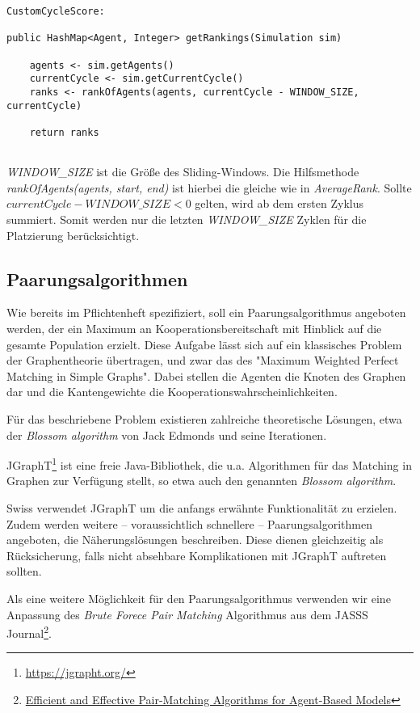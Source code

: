 \begin{lstlisting}
CustomCycleScore:

public HashMap<Agent, Integer> getRankings(Simulation sim) 
	
	agents <- sim.getAgents()
	currentCycle <- sim.getCurrentCycle()
	ranks <- rankOfAgents(agents, currentCycle - WINDOW_SIZE, currentCycle)
	
	return ranks
	
\end{lstlisting}
\emph{WINDOW\_SIZE} ist die Größe des Sliding-Windows. Die Hilfsmethode \emph{rankOfAgents(agents, start, end)} ist hierbei die gleiche wie in \emph{AverageRank}. Sollte $currentCycle - WINDOW\_SIZE < 0$ gelten, wird ab dem ersten Zyklus summiert. Somit werden nur die letzten \emph{WINDOW\_SIZE} Zyklen für die Platzierung berücksichtigt. 


\subsection{Paarungsalgorithmen}

Wie bereits im Pflichtenheft spezifiziert, soll ein Paarungsalgorithmus angeboten werden, der ein Maximum an Kooperationsbereitschaft mit Hinblick auf die gesamte Population erzielt. Diese Aufgabe lässt sich auf ein klassisches Problem der Graphentheorie übertragen, und zwar das des "Maximum Weighted Perfect Matching in Simple Graphs". Dabei stellen die Agenten die Knoten des Graphen dar und die Kantengewichte die Kooperationswahrscheinlichkeiten.

Für das beschriebene Problem existieren zahlreiche theoretische Lösungen, etwa der \emph{Blossom algorithm} von Jack Edmonds und seine Iterationen.

JGraphT\footnote{\href{https://jgrapht.org/}{https://jgrapht.org/}} ist eine freie Java-Bibliothek, die u.a. Algorithmen für das Matching in Graphen zur Verfügung stellt, so etwa auch den genannten \emph{Blossom algorithm}.

Swiss verwendet JGraphT um die anfangs erwähnte Funktionalität zu erzielen. Zudem werden weitere – voraussichtlich schnellere – Paarungsalgorithmen angeboten, die Näherungslösungen beschreiben. Diese dienen gleichzeitig als Rücksicherung, falls nicht absehbare Komplikationen mit JGraphT auftreten sollten.

Als eine weitere Möglichkeit für den Paarungsalgorithmus verwenden wir eine Anpassung des \emph{Brute Forece Pair Matching} Algorithmus aus dem JASSS Journal\footnote{\href{http://jasss.soc.surrey.ac.uk/20/4/8.html}{Efficient and Effective Pair-Matching Algorithms for Agent-Based Models}}.

